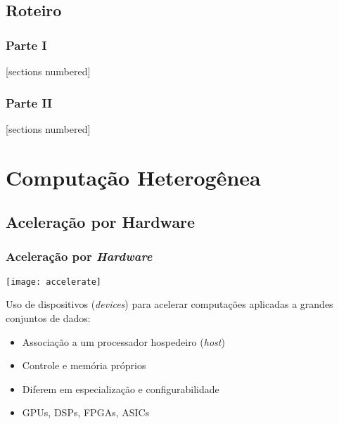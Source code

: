 \documentclass[10pt, compress, aspectratio=43, xcolor={table,usenames,dvipsnames}]{beamer}
\begin{document}
\subsection{Roteiro}

\begin{frame}
    \frametitle{Parte I}
    [sections numbered]
    \tableofcontents[hideallsubsections, part=1]
\end{frame}

\begin{frame}
    \frametitle{Parte II}
    [sections numbered]
    \tableofcontents[hideallsubsections, part=2]
\end{frame}

%

\section{Computação Heterogênea}

\subsection{Aceleração por Hardware}

\begin{frame}
    \frametitle{Aceleração por \textit{Hardware}}
    \begin{center}
        \texttt{[image: accelerate]}
    \end{center}

    Uso de \alert{dispositivos} (\textit{devices}) para acelerar computações
    aplicadas a grandes conjuntos de dados:
    \begin{itemize}
        \item Associação a um processador \alert{hospedeiro} (\textit{host})
        \item \alert{Controle} e \alert{memória} próprios
        \item Diferem em \alert{especialização} e \alert{configurabilidade}
        \item \alert{GPUs}, DSPs, FPGAs, ASICs
    \end{itemize}
\end{frame}
\end{document}

